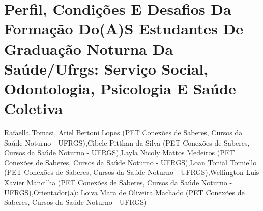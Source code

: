 


\section*{Perfil, Condições E Desafios Da Formação Do(A)S Estudantes De Graduação Noturna Da Saúde/Ufrgs:  Serviço Social, Odontologia, Psicologia E Saúde Coletiva}

Rafaella Tomasi, Ariel Bertoni Lopes (PET Conexões de Saberes, Cursos da Saúde Noturno - UFRGS),Cibele Pitthan da Silva (PET Conexões de Saberes, Cursos da Saúde Noturno - UFRGS),Layla Nicoly Mattos Medeiros (PET Conexões de Saberes, Cursos da Saúde Noturno - UFRGS),Loan Tonial Tomiello (PET Conexões de Saberes, Cursos da Saúde Noturno - UFRGS),Wellington Luis Xavier Mancilha (PET Conexões de Saberes, Cursos da Saúde Noturno - UFRGS),Orientador(a): Loiva Mara de Oliveira Machado (PET Conexões de Saberes, Cursos da Saúde Noturno - UFRGS)

